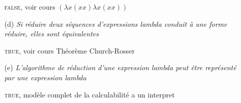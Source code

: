 \documentclass[a4paper,11pt,onecolumn]{article}
\begin{document}
\begin{enumerate}
\begin{itemize}
\textsc{false}, voir cours $(\lambda x (xx) \lambda x (xx))$

		\item[(d)] \textit{Si réduire deux séquences d'expressions lambda conduit à une forme réduire, elles sont équivalentes}

\textsc{true}, voir cours Théorème Church-Rosser
	
		\item[(e)] \textit{L'algorithme de réduction d'une expression lambda peut être représenté par une expression lambda}

\textsc{true}, modèle complet de la calculabilité a un interpret
	\end{itemize}
\end{enumerate}
\end{document}
